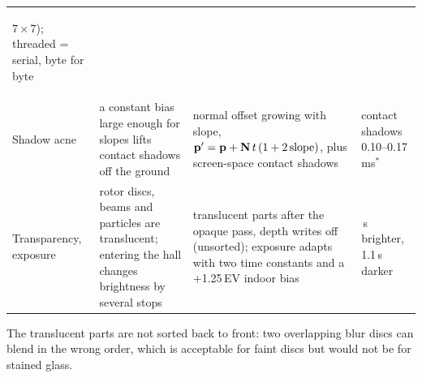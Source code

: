 \begin{table}[htbp]
\begin{tabularx}{\linewidth}{@{}>{\bfseries\raggedright\arraybackslash}p{2.2cm}>{\raggedright\arraybackslash}X>{\raggedright\arraybackslash}X>{\raggedright\arraybackslash}p{3.3cm}@{}}
  $7\times7$); threaded = serial, byte for byte\\
Shadow acne & a constant bias large enough for slopes lifts contact shadows off the ground & normal offset growing with
  slope, $\mathbf{p}'=\mathbf{p}+\mathbf{N}\,t\,(1+2\,\text{slope})$, plus screen-space contact shadows & contact shadows
  0.10--0.17\,ms$^\ast$\\
Transparency, exposure & rotor discs, beams and particles are translucent; entering the hall changes brightness by
  several stops & translucent parts after the opaque pass, depth writes off (unsorted); exposure adapts with two time
  constants and a +1.25\,EV indoor bias & 0.35\,s brighter, 1.1\,s darker\\
\bottomrule
\end{tabularx}
\end{table}

The translucent parts are not sorted back to front: two overlapping blur discs can blend in the wrong order, which is
acceptable for faint discs but would not be for stained glass.
